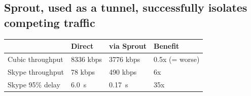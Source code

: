 \begin{multicols}{2}
\subsection*{Sprout, used as a tunnel, successfully isolates competing traffic}
\begin{center}
{\large \bf
\noindent \begin{tabular}{|l|l|l|l|}
\hline
& Direct & via Sprout & Benefit \\
\hline
\hline
Cubic throughput & 8336 kbps & 3776 kbps & \cellcolor{red!50} 0.5x (= worse) \\
Skype throughput & 78 kbps & 490 kbps & \cellcolor{green!50} 6x \\
Skype 95\% delay & 6.0~s & 0.17~s & \cellcolor{green!50} 35x  \\
\hline
\end{tabular}
}
\end{center}

\end{multicols}
